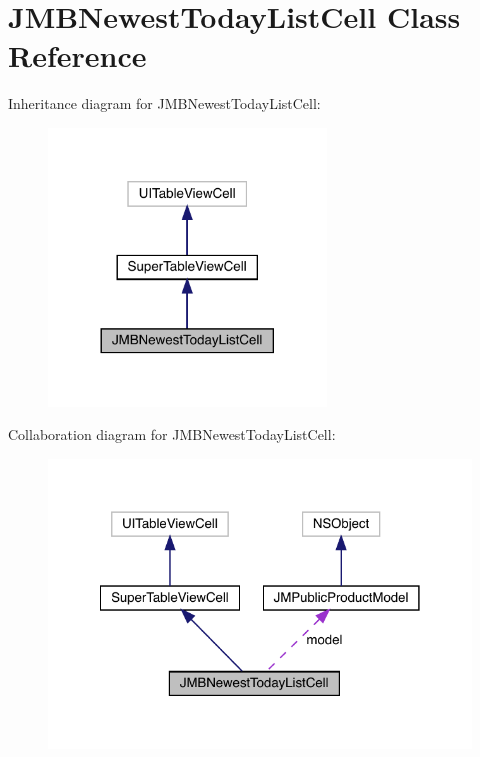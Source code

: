 \hypertarget{interface_j_m_b_newest_today_list_cell}{}\section{J\+M\+B\+Newest\+Today\+List\+Cell Class Reference}
\label{interface_j_m_b_newest_today_list_cell}


Inheritance diagram for J\+M\+B\+Newest\+Today\+List\+Cell\+:\nopagebreak
\begin{figure}[H]
\begin{center}
\leavevmode
\includegraphics[width=209pt]{interface_j_m_b_newest_today_list_cell__inherit__graph}
\end{center}
\end{figure}


Collaboration diagram for J\+M\+B\+Newest\+Today\+List\+Cell\+:\nopagebreak
\begin{figure}[H]
\begin{center}
\leavevmode
\includegraphics[width=322pt]{interface_j_m_b_newest_today_list_cell__coll__graph}
\end{center}
\end{figure}
